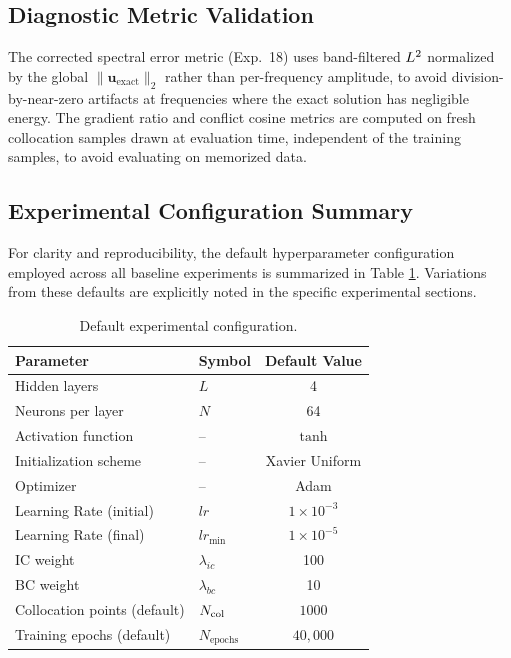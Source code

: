 \subsection{Diagnostic Metric Validation}

The corrected spectral error metric (Exp.~18) uses band-filtered $L^2$ normalized by the global $\|\mathbf{u}_{\text{exact}}\|_2$ rather than per-frequency amplitude, to avoid division-by-near-zero artifacts at frequencies where the exact solution has negligible energy. The gradient ratio and conflict cosine metrics are computed on fresh collocation samples drawn at evaluation time, independent of the training samples, to avoid evaluating on memorized data.

\subsection{Experimental Configuration Summary}

For clarity and reproducibility, the default hyperparameter configuration employed across all baseline experiments is summarized in Table \ref{tab:default_config}. Variations from these defaults are explicitly noted in the specific experimental sections.

\begin{table}[htpb]
\centering
\caption{Default experimental configuration.}
\label{tab:default_config}
\begin{tabular}{@{}llc@{}}
\toprule
Parameter & Symbol & Default Value \\
\midrule
Hidden layers & $L$ & 4 \\
Neurons per layer & $N$ & 64 \\
Activation function & -- & $\tanh$ \\
Initialization scheme & -- & Xavier Uniform \\
Optimizer & -- & Adam \\
Learning Rate (initial) & $lr$ & $1 \times 10^{-3}$ \\
Learning Rate (final) & $lr_{\min}$ & $1 \times 10^{-5}$ \\
IC weight & $\lambda_{ic}$ & 100 \\
BC weight & $\lambda_{bc}$ & 10 \\
Collocation points (default) & $N_{\mathrm{col}}$ & $1000$ \\
Training epochs (default) & $N_{\text{epochs}}$ & $40,000$ \\
\bottomrule
\end{tabular}
\end{table}

